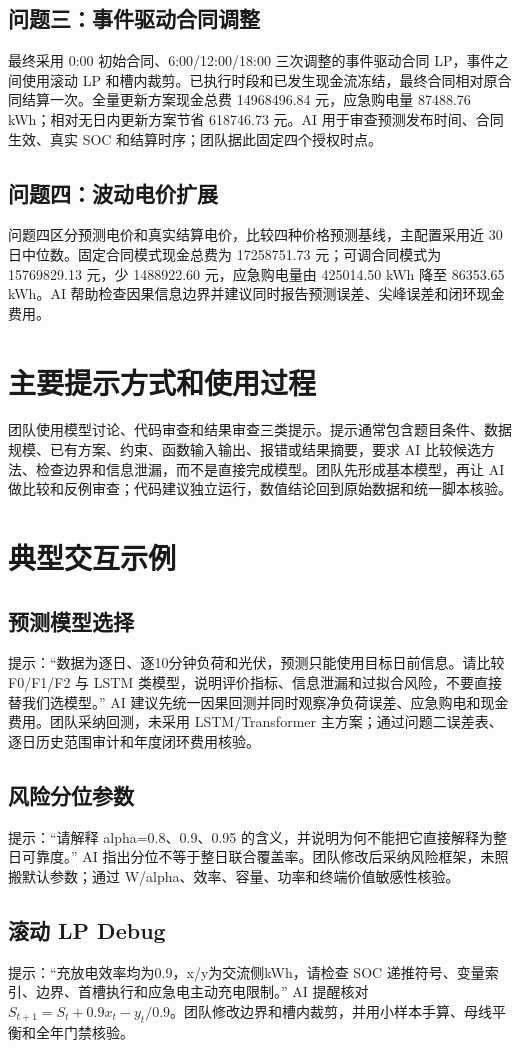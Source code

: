 \documentclass[UTF8,a4paper,11pt]{ctexart}
\begin{document}
\subsection{问题三：事件驱动合同调整}
最终采用 0:00 初始合同、6:00/12:00/18:00 三次调整的事件驱动合同 LP，事件之间使用滚动 LP 和槽内裁剪。已执行时段和已发生现金流冻结，最终合同相对原合同结算一次。全量更新方案现金总费 14968496.84 元，应急购电量 87488.76 kWh；相对无日内更新方案节省 618746.73 元。AI 用于审查预测发布时间、合同生效、真实 SOC 和结算时序；团队据此固定四个授权时点。
\subsection{问题四：波动电价扩展}
问题四区分预测电价和真实结算电价，比较四种价格预测基线，主配置采用近 30 日中位数。固定合同模式现金总费为 17258751.73 元；可调合同模式为 15769829.13 元，少 1488922.60 元，应急购电量由 425014.50 kWh 降至 86353.65 kWh。AI 帮助检查因果信息边界并建议同时报告预测误差、尖峰误差和闭环现金费用。
\section{主要提示方式和使用过程}
团队使用模型讨论、代码审查和结果审查三类提示。提示通常包含题目条件、数据规模、已有方案、约束、函数输入输出、报错或结果摘要，要求 AI 比较候选方法、检查边界和信息泄漏，而不是直接完成模型。团队先形成基本模型，再让 AI 做比较和反例审查；代码建议独立运行，数值结论回到原始数据和统一脚本核验。
\section{典型交互示例}
\subsection{预测模型选择}
提示：“数据为逐日、逐10分钟负荷和光伏，预测只能使用目标日前信息。请比较 F0/F1/F2 与 LSTM 类模型，说明评价指标、信息泄漏和过拟合风险，不要直接替我们选模型。” AI 建议先统一因果回测并同时观察净负荷误差、应急购电和现金费用。团队采纳回测，未采用 LSTM/Transformer 主方案；通过问题二误差表、逐日历史范围审计和年度闭环费用核验。
\subsection{风险分位参数}
提示：“请解释 alpha=0.8、0.9、0.95 的含义，并说明为何不能把它直接解释为整日可靠度。” AI 指出分位不等于整日联合覆盖率。团队修改后采纳风险框架，未照搬默认参数；通过 W/alpha、效率、容量、功率和终端价值敏感性核验。
\subsection{滚动 LP Debug}
提示：“充放电效率均为0.9，x/y为交流侧kWh，请检查 SOC 递推符号、变量索引、边界、首槽执行和应急电主动充电限制。” AI 提醒核对 $S_{t+1}=S_t+0.9x_t-y_t/0.9$。团队修改边界和槽内裁剪，并用小样本手算、母线平衡和全年门禁核验。
\end{document}
